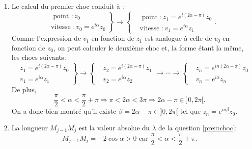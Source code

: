 \begin{enumerate}
\item Le calcul du premier choc conduit à :
\begin{displaymath}
  \left. 
  \begin{aligned}
   &\text{ point }: z_0 \\ &\text{vitesse }: v_0 = e^{i\alpha} z_0 
  \end{aligned}
\right\rbrace 
\longrightarrow
  \left\lbrace 
  \begin{aligned}
   &\text{ point }: z_1 = e^{i(2\alpha - \pi)} z_0 \\ &\text{vitesse }: v_1 = e^{i\alpha} z_1 
  \end{aligned}
\right. .
\end{displaymath}
Comme l'expression de $v_1$ en fonction de $z_1$ est analogue à celle de $v_0$ en fonction de $z_0$, on peut calculer le deuxième choc et, la forme étant la même, les chocs suivants:
\begin{displaymath}
  \left. 
  \begin{aligned}
   &z_1 = e^{i(2\alpha - \pi)} z_0 \\ &v_1 = e^{i\alpha} z_1 
  \end{aligned}
\right\rbrace 
\longrightarrow
  \left\lbrace 
  \begin{aligned}
   &z_2 = e^{i(2\alpha - \pi)} z_1 \\ &v_2 = e^{i\alpha} z_2 
  \end{aligned}
\right. 
\longrightarrow \cdots \longrightarrow
\left\lbrace 
  \begin{aligned}
   &z_n = e^{in(2\alpha - \pi)} z_0 \\ &v_n = e^{i\alpha} z_n 
  \end{aligned}
\right. 
\end{displaymath}
De plus,
\begin{displaymath}
  \frac{\pi}{2}<\alpha<\frac{\pi}{2} + \pi \Rightarrow \pi<2\alpha<3\pi\Rightarrow 2\alpha - \pi \in ]0,2\pi[ .
\end{displaymath}
On a donc bien montré qu'il existe $\beta = 2\alpha - \pi \in ]0,2\pi[$ tel que $z_n = e^{in\beta}z_0$.

\item La longueur $M_{j-1}M_{j}$ est la valeur absolue du $\lambda$ de la question \ref{premchoc}:
\begin{displaymath}
  M_{j-1}M_{j} = -2\cos\alpha >0 \text{ car } \frac{\pi}{2} < \alpha < \frac{\pi}{2} + \pi .
\end{displaymath}


\end{enumerate}
